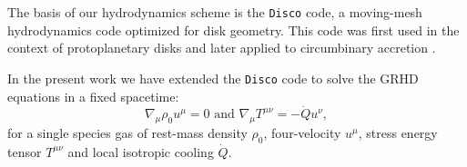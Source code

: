 \documentclass{emulateapj}
\newcommand{\Disco}{{\texttt{Disco}}}
\begin{document}
The basis of our hydrodynamics scheme is the \Disco{} code, a moving-mesh hydrodynamics
code optimized for disk geometry. This code was first used in the context of
protoplanetary disks \citep{Duffell12, Duffell13, Duffell14} and later applied 
to circumbinary accretion \citep{Farris14, Farris15A, Farris15B}. 

In the present work we have extended the \Disco{} code to solve the GRHD equations in a fixed spacetime:
\begin{equation}
    \nabla_\mu \rho_0 u^\mu = 0 \text{ and } \nabla_\mu T^{\mu\nu} = -\dot{Q} u^\nu , \label{eq:GRHD}
\end{equation}
for a single species gas of rest-mass density $\rho_0$, four-velocity $u^\mu$, stress energy tensor $T^{\mu\nu}$ and local isotropic cooling $\dot{Q}$.  
\end{document}
